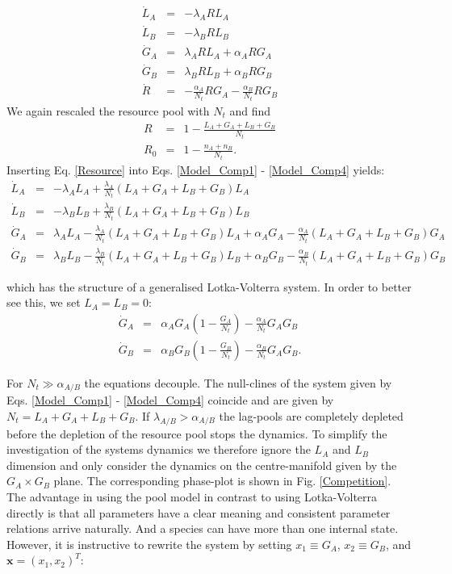 \documentclass[10pt,A4paper]{article}
\begin{document}
\begin{eqnarray}
\label{Model_Comp1}
\dot{L}_A &=& - \lambda_A R L_A\\
\dot{L}_B &=& - \lambda_B R L_B \\
\dot{G}_A &=& \lambda_A R L_A +\alpha_A R G_A\\
\label{Model_Comp4}
\dot{G}_B &=& \lambda_B R L_B +\alpha_B R G_B\\
\dot{R} &=&-\frac{\alpha_A}{N_t} R G_A-\frac{\alpha_B}{N_t} R G_B
\end{eqnarray}
We again rescaled the resource pool with $N_t$ and find
\begin{eqnarray}
\label{Resource}
R &=&1-\frac{L_A+G_A+L_B+G_B}{N_t}\\
R_0&=&1-\frac{n_A+n_B}{N_t}. 
\end{eqnarray}
Inserting Eq. \ref{Resource} into Eqs. \ref{Model_Comp1} - \ref{Model_Comp4} yields:
\begin{eqnarray*}
\dot{L}_A &=& - \lambda_A  L_A + \frac{\lambda_A}{N_t}\left(L_A+G_A+L_B+G_B\right )L_A\\
\dot{L}_B &=& - \lambda_B L_B + \frac{\lambda_B}{N_t}\left(L_A+G_A+L_B+G_B\right )L_B \\
\dot{G}_A &=&  \lambda_A  L_A - \frac{\lambda_A}{N_t}\left(L_A+G_A+L_B+G_B\right )L_A +\alpha_A G_A - \frac{\alpha_A}{N_t}\left(L_A+G_A+L_B+G_B\right )G_A\\
\dot{G}_B &=& \lambda_B L_B - \frac{\lambda_B}{N_t}\left(L_A+G_A+L_B+G_B\right )L_B  +\alpha_B G_B -\frac{\alpha_B}{N_t}\left(L_A+G_A+L_B+G_B\right )G_B
\end{eqnarray*}

which has the structure of a generalised Lotka-Volterra system. In order to better see this, we set $L_A=L_B=0$: 
\begin{eqnarray}
\label{Comp_Model}
\dot{G}_A &=& \alpha_A G_A\left(1 - \frac{G_A}{N_t}\right ) - \frac{\alpha_A}{N_t}G_AG_B\\
\dot{G}_B &=& \alpha_B G_B\left(1-\frac{G_B}{N_t}\right ) -\frac{\alpha_B}{N_t}G_AG_B. 
\end{eqnarray} 

For $N_t\gg\alpha_{A/B}$ the equations decouple. 
The null-clines of the system given by Eqs. \ref{Model_Comp1} - \ref{Model_Comp4} coincide and are given by $N_t=L_A+G_A+L_B+G_B$. 
If $\lambda_{A/B}>\alpha_{A/B}$ the lag-pools are completely depleted before the depletion of the resource pool stops the dynamics. 
To simplify the investigation of the systems dynamics we therefore ignore the $L_A$ and $L_B$ dimension and only consider the dynamics on the centre-manifold given by the $G_A\times G_B$ plane. 
The corresponding phase-plot is shown in Fig. \ref{Competition}. 
The advantage in using the pool model in contrast to using Lotka-Volterra directly is that all parameters have a clear meaning and consistent parameter relations arrive naturally. 
And a species can have more than one internal state. 
However, it is instructive to rewrite the system by setting $x_1\equiv G_A$, $x_2\equiv G_B$, and $\mathbf{x}=(x_1,x_2)^T$:
\end{document}
